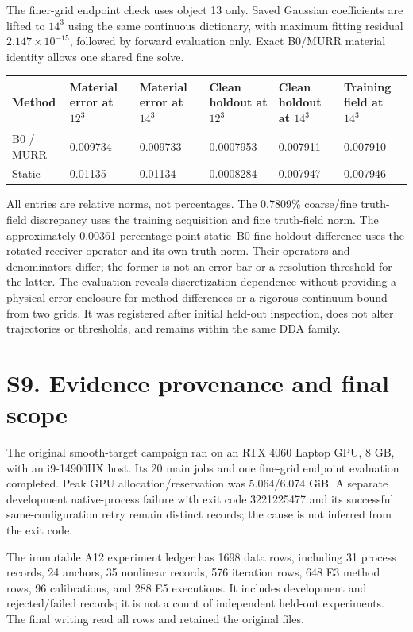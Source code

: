 \documentclass[11pt]{article}
\begin{document}
The finer-grid endpoint check uses object 13 only. Saved Gaussian coefficients are lifted to \(14^3\) using the same continuous dictionary, with maximum fitting residual \(2.147\times10^{-15}\), followed by forward evaluation only. Exact B0/MURR material identity allows one shared fine solve.

\begin{table}[tbp]\centering\footnotesize\setlength{\tabcolsep}{3pt}
\begin{tabularx}{\linewidth}{lXXXXX}\toprule
Method & Material error at \(12^3\) & Material error at \(14^3\) & Clean holdout at \(12^3\) & Clean holdout at \(14^3\) & Training field at \(14^3\) \\\midrule
B0 / MURR & 0.009734 & 0.009733 & 0.0007953 & 0.007911 & 0.007910 \\
Static & 0.01135 & 0.01134 & 0.0008284 & 0.007947 & 0.007946 \\
\bottomrule\end{tabularx}
\end{table}

All entries are relative norms, not percentages. The 0.7809\% coarse/fine truth-field discrepancy uses the training acquisition and fine truth-field norm. The approximately 0.00361 percentage-point static--B0 fine holdout difference uses the rotated receiver operator and its own truth norm. Their operators and denominators differ; the former is not an error bar or a resolution threshold for the latter. The evaluation reveals discretization dependence without providing a physical-error enclosure for method differences or a rigorous continuum bound from two grids. It was registered after initial held-out inspection, does not alter trajectories or thresholds, and remains within the same DDA family.

\section*{S9. Evidence provenance and final scope}

The original smooth-target campaign ran on an RTX 4060 Laptop GPU, 8 GB, with an i9-14900HX host. Its 20 main jobs and one fine-grid endpoint evaluation completed. Peak GPU allocation/reservation was 5.064/6.074 GiB. A separate development native-process failure with exit code 3221225477 and its successful same-configuration retry remain distinct records; the cause is not inferred from the exit code.

The immutable A12 experiment ledger has 1698 data rows, including 31 process records, 24 anchors, 35 nonlinear records, 576 iteration rows, 648 E3 method rows, 96 calibrations, and 288 E5 executions. It includes development and rejected/failed records; it is not a count of independent held-out experiments. The final writing read all rows and retained the original files.
\end{document}
